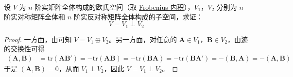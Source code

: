 \documentclass[../../main.tex]{subfiles}
\begin{document}
\begin{proposition}\label{proposition:例9.22}
设 $V$ 为 $n$ 阶实矩阵全体构成的欧氏空间（取 \hyperlink{Frobenius 内积}{Frobenius 内积}），$V_1$，$V_2$ 分别为 $n$ 阶实对称矩阵全体和 $n$ 阶实反对称矩阵全体构成的子空间，求证：
\[ V = V_1 \perp V_2 \]
\end{proposition}
\begin{proof}
一方面，由可知 $V = V_1 \oplus V_2$。另一方面，对任意的 $\boldsymbol{A} \in V_1$，$\boldsymbol{B} \in V_2$，由迹的交换性可得
\begin{align*}
(\boldsymbol{A}, \boldsymbol{B}) &= \mathrm{tr}(\boldsymbol{A}\boldsymbol{B}') = -\mathrm{tr}(\boldsymbol{A}\boldsymbol{B}) = -\mathrm{tr}(\boldsymbol{B}\boldsymbol{A}) = -\mathrm{tr}(\boldsymbol{B}\boldsymbol{A}') = -(\boldsymbol{B}, \boldsymbol{A}) = -(\boldsymbol{A}, \boldsymbol{B})
\end{align*}
于是 $(\boldsymbol{A}, \boldsymbol{B}) = 0$，从而 $V_1 \perp V_2$，因此 $V = V_1 \perp V_2$。
\end{proof}
\end{document}
